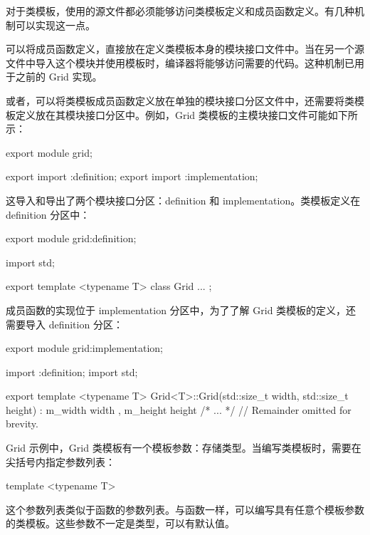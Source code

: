 
对于类模板，使用的源文件都必须能够访问类模板定义和成员函数定义。有几种机制可以实现这一点。


可以将成员函数定义，直接放在定义类模板本身的模块接口文件中。当在另一个源文件中导入这个模块并使用模板时，编译器将能够访问需要的代码。这种机制已用于之前的 Grid 实现。


或者，可以将类模板成员函数定义放在单独的模块接口分区文件中，还需要将类模板定义放在其模块接口分区中。例如，Grid 类模板的主模块接口文件可能如下所示：

\begin{cpp}
export module grid;

export import :definition;
export import :implementation;
\end{cpp}

这导入和导出了两个模块接口分区：definition 和 implementation。类模板定义在 definition 分区中：

\begin{cpp}
export module grid:definition;

import std;

export template <typename T> class Grid { ... };
\end{cpp}

成员函数的实现位于 implementation 分区中，为了了解 Grid 类模板的定义，还需要导入 definition 分区：

\begin{cpp}
export module grid:implementation;

import :definition;
import std;

export template <typename T>
Grid<T>::Grid(std::size_t width, std::size_t height)
    : m_width { width }, m_height { height }
{ /* ... */ }
// Remainder omitted for brevity.
\end{cpp}


Grid 示例中，Grid 类模板有一个模板参数：存储类型。当编写类模板时，需要在尖括号内指定参数列表：

\begin{cpp}
template <typename T>
\end{cpp}

这个参数列表类似于函数的参数列表。与函数一样，可以编写具有任意个模板参数的类模板。这些参数不一定是类型，可以有默认值。

